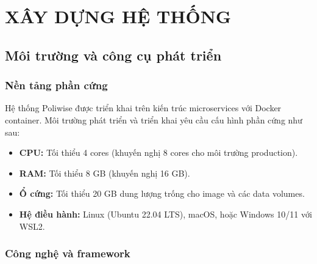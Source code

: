 \documentclass[12pt,a4paper]{report}
\begin{document}


\setcounter{chapter}{3}

\chapter{XÂY DỰNG HỆ THỐNG}

\section{Môi trường và công cụ phát triển}

\subsection{Nền tảng phần cứng}
Hệ thống Poliwise được triển khai trên kiến trúc microservices với Docker container. Môi trường phát triển và triển khai yêu cầu cấu hình phần cứng như sau:
\begin{itemize}
    \item \textbf{CPU:} Tối thiểu 4 cores (khuyến nghị 8 cores cho môi trường production).
    \item \textbf{RAM:} Tối thiểu 8 GB (khuyến nghị 16 GB).
    \item \textbf{Ổ cứng:} Tối thiểu 20 GB dung lượng trống cho image và các data volumes.
    \item \textbf{Hệ điều hành:} Linux (Ubuntu 22.04 LTS), macOS, hoặc Windows 10/11 với WSL2.
\end{itemize}

\subsection{Công nghệ và framework}
\end{document}
